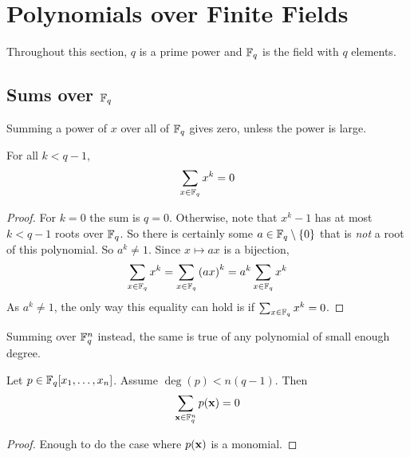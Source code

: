 \section{Polynomials over Finite Fields}

Throughout this section, $q$ is a prime power and $\mathbb{F}_q$ is the field with $q$ elements.

\subsection{Sums over $\mathbb{F}_q$}

Summing a power of $x$ over all of $\mathbb{F}_q$ gives zero, unless the power is large.

\begin{boxtheorem}
    For all $k < q - 1$,
    \begin{align*}
        \sum_{x \in \mathbb{F}_q} x^k = 0
    \end{align*}
\end{boxtheorem}
\begin{proof}
    For $k = 0$ the sum is $q = 0$. Otherwise, note that $x^{k} - 1$ has at most $k < q - 1$ roots over $\mathbb{F}_q$. So there is certainly some $a \in \mathbb{F}_q \setminus \left\{ 0 \right\}$ that is \textit{not} a root of this polynomial. So $a^k \neq 1$. Since $x \mapsto ax$ is a bijection,
    \begin{align*}
        \sum_{x \in \mathbb{F}_q} x^k = \sum_{x \in \mathbb{F}_q} \left( ax \right)^k = a^k \sum_{x \in \mathbb{F}_q} x^k
    \end{align*}
    As $a^k \ne 1$, the only way this equality can hold is if $\sum_{x \in \mathbb{F}_q} x^k = 0$.
\end{proof}

Summing over $\mathbb{F}_q^n$ instead, the same is true of any polynomial of small enough degree.

\begin{boxtheorem} \label{Ch8:Thm:Sum_Over_Fq}
    Let $p \in \mathbb{F}_q\!\left[ x_1, \ldots, x_n \right]$. Assume $\deg(p) < n(q - 1)$. Then
    \begin{align*}
        \sum_{\mathbf{x} \in \mathbb{F}_q^n} p\!\left( \mathbf{x} \right) = 0
    \end{align*}
\end{boxtheorem}
\begin{proof}
    Enough to do the case where $p(\mathbf{x})$ is a monomial. \sorry
\end{proof}

